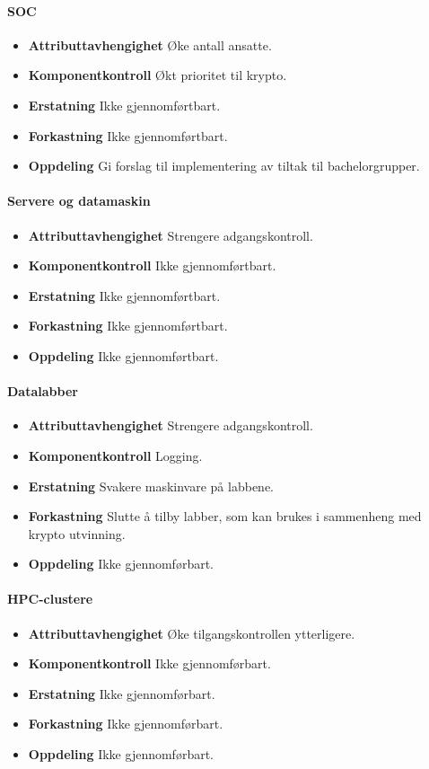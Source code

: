 \paragraph{SOC}
\begin{itemize}
    \item \textbf{Attributtavhengighet} Øke antall ansatte.
    \item \textbf{Komponentkontroll} Økt prioritet til krypto.
    \item \textbf{Erstatning} Ikke gjennomførtbart.
    \item \textbf{Forkastning} Ikke gjennomførtbart.
    \item \textbf{Oppdeling} Gi forslag til implementering av tiltak til bachelorgrupper.
\end{itemize}

\paragraph{Servere og datamaskin}
\begin{itemize}
    \item \textbf{Attributtavhengighet} Strengere adgangskontroll.
    \item \textbf{Komponentkontroll} Ikke gjennomførtbart.
    \item \textbf{Erstatning} Ikke gjennomførtbart.
    \item \textbf{Forkastning} Ikke gjennomførtbart.
    \item \textbf{Oppdeling} Ikke gjennomførtbart.
\end{itemize}

\paragraph{Datalabber}
\begin{itemize}
    \item \textbf{Attributtavhengighet} Strengere adgangskontroll.
    \item \textbf{Komponentkontroll} Logging.
    \item \textbf{Erstatning} Svakere maskinvare på labbene.
    \item \textbf{Forkastning} Slutte å tilby labber, som kan brukes i sammenheng med krypto utvinning.
    \item \textbf{Oppdeling} Ikke gjennomførbart.
\end{itemize}

\paragraph{HPC-clustere}
\begin{itemize}
    \item \textbf{Attributtavhengighet} Øke tilgangskontrollen ytterligere.
    \item \textbf{Komponentkontroll} Ikke gjennomførbart.
    \item \textbf{Erstatning} Ikke gjennomførbart.
    \item \textbf{Forkastning} Ikke gjennomførbart.
    \item \textbf{Oppdeling} Ikke gjennomførbart.
\end{itemize}


